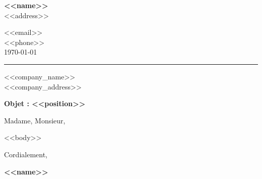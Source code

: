 \documentclass[11pt]{article}
\begin{document}
\noindent
\begin{minipage}[t]{0.55\textwidth}
  {\Large\bfseries\color{darkgray} <<name>>}\\[4pt]
  {\small\color{medgray} <<address>>}
\end{minipage}%
\hfill
\begin{minipage}[t]{0.40\textwidth}
  \raggedleft
  {\small\color{medgray} <<email>>}\\
  {\small\color{medgray} <<phone>>}\\
  {\small\color{medgray} \today}
\end{minipage}

\vspace{0.3em}
{\color{lightgray}\rule{\linewidth}{0.3pt}}
\vspace{1em}

<<company_name>>\\
{\small\color{medgray} <<company_address>>}

\vspace{1em}

{\bfseries\color{darkgray} Objet : <<position>>}

\vspace{0.8em}

Madame, Monsieur,

<<body>>

\vspace{1.5em}

Cordialement,

\vspace{2em}

{\bfseries <<name>>}
\end{document}

